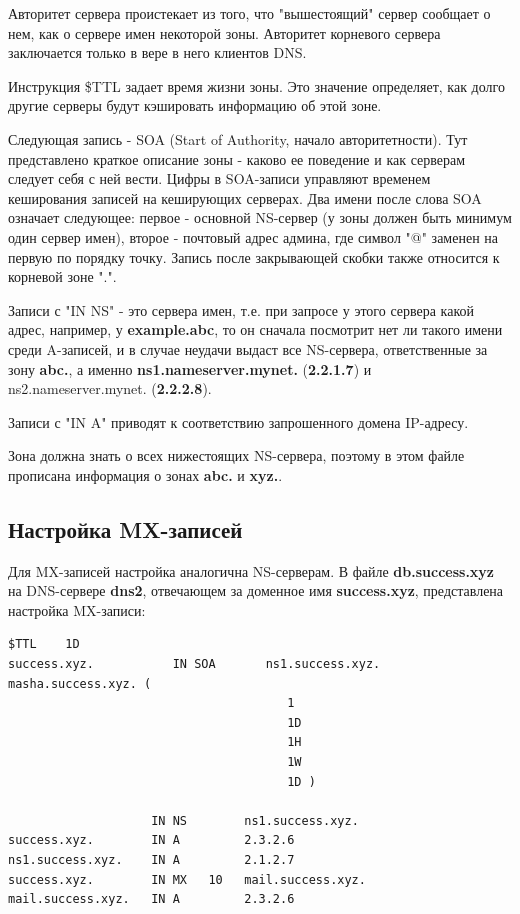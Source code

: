 \documentclass[a4paper,12pt]{article}
\begin{document}
Авторитет сервера проистекает из того, что "вышестоящий" сервер сообщает о нем, как о сервере имен некоторой зоны. Авторитет корневого сервера заключается только в вере в него клиентов DNS.

Инструкция \$TTL задает время жизни зоны. Это значение определяет, как долго другие серверы будут кэшировать информацию об этой зоне.

Следующая запись - SOA (Start of Authority, начало авторитетности). Тут представлено краткое описание зоны - каково ее поведение и как серверам следует себя с ней вести. Цифры в SOA-записи управляют временем кеширования записей на кеширующих серверах. Два имени после слова SOA означает следующее: первое - основной NS-сервер (у зоны должен быть минимум один сервер имен), второе - почтовый адрес админа, где символ "@" заменен на первую по порядку точку. Запись после закрывающей скобки также относится к корневой зоне ".".

Записи с "IN NS" - это сервера имен, т.е. при запросе у этого сервера какой адрес, например, у \textbf{example.abc}, то он сначала посмотрит нет ли такого имени среди A-записей, и в случае неудачи выдаст все NS-сервера, ответственные за зону \textbf{abc.}, а именно \textbf{ns1.nameserver.mynet.} (\textbf{2.2.1.7}) и {ns2.nameserver.mynet.} (\textbf{2.2.2.8}).

Записи с "IN A" приводят к соответствию запрошенного домена IP-адресу.

Зона должна знать о всех нижестоящих NS-сервера, поэтому в этом файле прописана информация о зонах \textbf{abc.} и \textbf{xyz.}.

\subsection{Настройка MX-записей}

Для MX-записей настройка аналогична NS-серверам. В файле \textbf{db.success.xyz} на DNS-сервере \textbf{dns2}, отвечающем за доменное имя \textbf{success.xyz}, представлена настройка MX-записи:
\begin{verbatim}
$TTL    1D
success.xyz.           IN SOA       ns1.success.xyz. masha.success.xyz. (
                                       1
                                       1D
                                       1H
                                       1W
                                       1D )

                    IN NS        ns1.success.xyz.
success.xyz.        IN A         2.3.2.6
ns1.success.xyz.    IN A         2.1.2.7
success.xyz.        IN MX   10   mail.success.xyz.
mail.success.xyz.   IN A         2.3.2.6
\end{verbatim}
\end{document}
